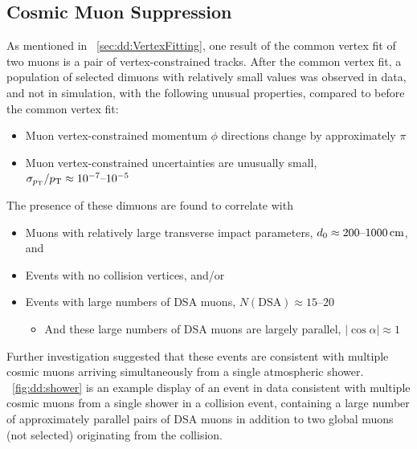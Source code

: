\subsection{Cosmic Muon Suppression}
\label{sec:dd:CosmicCuts}
As mentioned in \Sec~\ref{sec:dd:VertexFitting}, one result of the common vertex fit of two muons is a pair of vertex-constrained tracks.
After the common vertex fit, a population of selected dimuons with relatively small \vchisq values was observed in data, and not in simulation, with the following unusual properties, compared to before the common vertex fit:
\begin{itemize}
  \item Muon vertex-constrained momentum $\phi$ directions change by approximately $\pi$
  \item Muon vertex-constrained \pT uncertainties are unusually small, \ie $\sigma_{p_{\mathrm{T}}}/p_{\mathrm{T}} \approx 10^{-7}\text{--}10^{-5}$
\end{itemize}
The presence of these dimuons are found to correlate with
\begin{itemize}
  \item Muons with relatively large transverse impact parameters, \ie $d_0 \approx 200\text{--}1000\,\text{cm}$, and
  \item Events with no \pp collision vertices, and/or
  \item Events with large numbers of DSA muons, \ie $N(\text{DSA}) \approx 15\text{--}20$
    \begin{itemize}
      \item And these large numbers of DSA muons are largely parallel, \ie $|\cos{\alpha}| \approx 1$
    \end{itemize}
\end{itemize}
Further investigation suggested that these events are consistent with multiple cosmic muons arriving simultaneously from a single atmospheric shower.
\Fig~\ref{fig:dd:shower} is an example display of an event in data consistent with multiple cosmic muons from a single shower in a \pp collision event, containing a large number of approximately parallel pairs of DSA muons in addition to two global muons (not selected) originating from the \pp collision.

